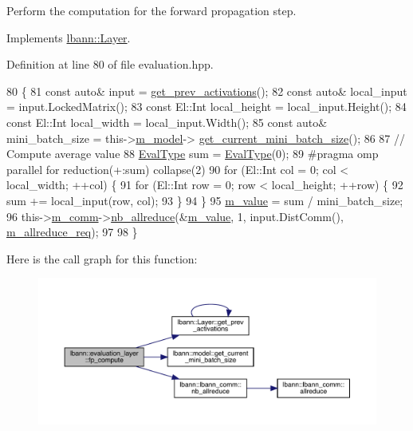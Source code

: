 Perform the computation for the forward propagation step. 

Implements \hyperlink{classlbann_1_1Layer_a523319dd1bd87a0612afa1912bb5aad7}{lbann\+::\+Layer}.



Definition at line 80 of file evaluation.\+hpp.


\begin{DoxyCode}
80                                      \{
81     \textcolor{keyword}{const} \textcolor{keyword}{auto}& input = \hyperlink{classlbann_1_1Layer_a45853df73a2e72bfaa774665a0f37ed7}{get\_prev\_activations}();
82     \textcolor{keyword}{const} \textcolor{keyword}{auto}& local\_input = input.LockedMatrix();
83     \textcolor{keyword}{const} El::Int local\_height = local\_input.Height();
84     \textcolor{keyword}{const} El::Int local\_width = local\_input.Width();
85     \textcolor{keyword}{const} \textcolor{keyword}{auto}& mini\_batch\_size = this->\hyperlink{classlbann_1_1Layer_a3d9315e99574166f2f33e37b572021d2}{m\_model}->
      \hyperlink{classlbann_1_1model_a3eaad8fd538b99ecab9afca6dc3327fd}{get\_current\_mini\_batch\_size}();
86 
87     \textcolor{comment}{// Compute average value}
88     \hyperlink{base_8hpp_a3266f5ac18504bbadea983c109566867}{EvalType} sum = \hyperlink{base_8hpp_a3266f5ac18504bbadea983c109566867}{EvalType}(0);
89 \textcolor{preprocessor}{    #pragma omp parallel for reduction(+:sum) collapse(2)}
90     \textcolor{keywordflow}{for} (El::Int col = 0; col < local\_width; ++col) \{
91       \textcolor{keywordflow}{for} (El::Int row = 0; row < local\_height; ++row) \{
92         sum += local\_input(row, col);
93       \}
94     \}
95     \hyperlink{classlbann_1_1evaluation__layer_a0d45f7694e2778f0a0dfb49212f37aef}{m\_value} = sum / mini\_batch\_size;
96     this->\hyperlink{classlbann_1_1Layer_a5de05c52f22e0bbd7c703bec3ad4dbf2}{m\_comm}->\hyperlink{classlbann_1_1lbann__comm_a2a7bb6cf3707366fc0671d8894ca30ea}{nb\_allreduce}(&\hyperlink{classlbann_1_1evaluation__layer_a0d45f7694e2778f0a0dfb49212f37aef}{m\_value}, 1, input.DistComm(), 
      \hyperlink{classlbann_1_1evaluation__layer_a3f2143da6cab67a7e1407a73116a2469}{m\_allreduce\_req});
97 
98   \}
\end{DoxyCode}
Here is the call graph for this function\+:\nopagebreak
\begin{figure}[H]
\begin{center}
\leavevmode
\includegraphics[width=350pt]{classlbann_1_1evaluation__layer_a6cb3ab97ec80b6cf8606b421d9761c1c_cgraph}
\end{center}
\end{figure}
